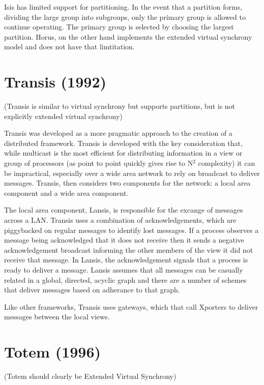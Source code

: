 Isis has limited support for partitioning. In the event that
a partition forms, dividing the large group into subgroups, only the primary
group is allowed to continue operating. The primary group is selected by
choosing the largest partition. Horus, on the other hand implements the extended
virtual synchrony model and does not have that limtitation.

\section{Transis (1992)}

(Transis is similar to virtual synchrony but supports partitions, but is not explicitly extended virtual synchrony)

Transis was developed as a more pragmatic approach to the creation of a distributed
framework. Transis is developed with the key consideration that, while multicast is
the most efficient for distributing information in a view or group of processors (as
point to point quickly gives rise to N$^{2}$ complexity) it can be impractical, especially
over a wide area network to rely on broadcast to deliver messages. Transis, then
considers two components for the network: a local area component and a wide area 
component.

The local area component, Lansis, is responsible for the excange of messages across a
LAN. Transis uses a combination of acknowledgements, which are piggybacked on regular
messages to identify lost messages. If a process observes a message being acknowledged
that it does not receive then it sends a negative acknowledgement broadcast informing
the other members of the view it did not receive that message. In Lansis, the 
acknowledgement signals that a process is ready to deliver a message. Lansis assumes
that all messages can be casually related in a global, directed, acyclic graph and
there are a number of schemes that deliver messages based on adherance to that graph.

Like other frameworks, Transis uses gateways, which that call Xporters to deliver
messages between the local views. 

\section{Totem (1996)}

(Totem should clearly be Extended Virtual Synchrony)

